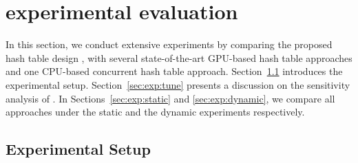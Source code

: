 \section{experimental evaluation}\label{sec:exp}
In this section, we conduct extensive experiments by comparing the proposed hash table design \voter, with several state-of-the-art GPU-based hash table approaches and one CPU-based concurrent hash table approach. 
Section~\ref{sec:exp:setup} introduces the experimental setup. 
Section~\ref{sec:exp:tune} presents a discussion on the sensitivity analysis of \voter.
In Sections~\ref{sec:exp:static} and \ref{sec:exp:dynamic}, we compare all approaches under the static and the dynamic experiments respectively.

\subsection{Experimental Setup}\label{sec:exp:setup}

